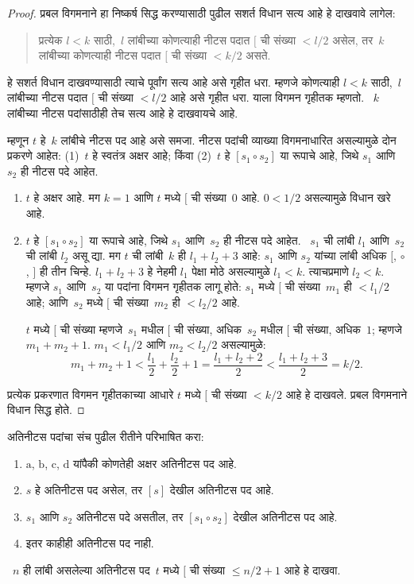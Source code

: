 \documentclass[../../../include/open-logic-section]{subfiles}
\begin{document}
\begin{proof}
प्रबल विगमनाने हा निष्कर्ष सिद्ध करण्यासाठी पुढील सशर्त विधान सत्य आहे हे दाखवावे लागेल:
\begin{quote}
प्रत्येक $l < k$ साठी,~$l$ लांबीच्या कोणत्याही नीटस पदात $[$ ची संख्या $< l/2$ असेल, तर~$k$ लांबीच्या कोणत्याही नीटस पदात $[$ ची संख्या $< k/2$ असते.
\end{quote}
हे सशर्त विधान दाखवण्यासाठी त्याचे पूर्वांग सत्य आहे असे गृहीत धरा. म्हणजे कोणत्याही $l<k$ साठी,~$l$ लांबीच्या नीटस पदात $[$ ची संख्या $< l/2$ आहे असे गृहीत धरा. याला विगमन गृहीतक म्हणतो. ~$k$ लांबीच्या नीटस पदांसाठीही तेच सत्य आहे हे दाखवायचे आहे.

म्हणून $t$ हे~$k$ लांबीचे नीटस पद आहे असे समजा. नीटस पदांची व्याख्या विगमनाधारित असल्यामुळे दोन प्रकरणे आहेत: (1)~$t$ हे स्वतंत्र अक्षर आहे; किंवा (2)~$t$ हे $[s_1 \circ s_2]$ या रूपाचे आहे, जिथे $s_1$ आणि~$s_2$ ही नीटस पदे आहेत.
\begin{enumerate}
\item $t$ हे अक्षर आहे. मग $k = 1$ आणि $t$ मध्ये $[$ ची संख्या~$0$ आहे. $0 < 1/2$ असल्यामुळे विधान खरे आहे.
\item $t$ हे $[s_1 \circ s_2]$ या रूपाचे आहे, जिथे $s_1$ आणि~$s_2$ ही नीटस पदे आहेत. ~$s_1$ ची लांबी $l_1$ आणि~$s_2$ ची लांबी $l_2$ असू द्या. मग $t$ ची लांबी~$k$ ही $l_1+l_2+3$ आहे: $s_1$ आणि $s_2$ यांच्या लांबी अधिक $[$, $\circ$, $]$ ही तीन चिन्हे. $l_1+l_2+3$ हे नेहमी $l_1$ पेक्षा मोठे असल्यामुळे $l_1 < k$. त्याचप्रमाणे $l_2 < k$. म्हणजे $s_1$ आणि~$s_2$ या पदांना विगमन गृहीतक लागू होते: $s_1$ मध्ये $[$ ची संख्या~$m_1$ ही $< l_1/2$ आहे; आणि~$s_2$ मध्ये $[$ ची संख्या~$m_2$ ही $< l_2/2$ आहे.

$t$ मध्ये $[$ ची संख्या म्हणजे~$s_1$ मधील $[$ ची संख्या, अधिक~$s_2$ मधील $[$ ची संख्या, अधिक~$1$; म्हणजे $m_1 + m_2 + 1$. $m_1 < l_1/2$ आणि $m_2 < l_2/2$ असल्यामुळे:
\[
  m_1 + m_2 + 1 < \frac{l_1}{2} + \frac{l_2}{2} + 1 = \frac{l_1+l_2+2}{2} < \frac{l_1+l_2+3}{2} = k/2.
\]
\end{enumerate}
प्रत्येक प्रकरणात विगमन गृहीतकाच्या आधारे $t$ मध्ये $[$ ची संख्या $< k/2$ आहे हे दाखवले. प्रबल विगमनाने विधान सिद्ध होते.
\end{proof}

\begin{prob}
अतिनीटस पदांचा संच पुढील रीतीने परिभाषित करा:
\begin{enumerate}
\item $\mathrm{a}$, $\mathrm{b}$, $\mathrm{c}$, $\mathrm{d}$ यांपैकी कोणतेही अक्षर अतिनीटस पद आहे.
\item $s$ हे अतिनीटस पद असेल, तर $[s]$ देखील अतिनीटस पद आहे.
\item $s_1$ आणि $s_2$ अतिनीटस पदे असतील, तर $[s_1 \circ s_2]$ देखील अतिनीटस पद आहे.
\item इतर काहीही अतिनीटस पद नाही.
\end{enumerate}
~$n$ ही लांबी असलेल्या अतिनीटस पद~$t$ मध्ये $[$ ची संख्या $\le n/2 +1$ आहे हे दाखवा.
\end{prob}
\end{document}
